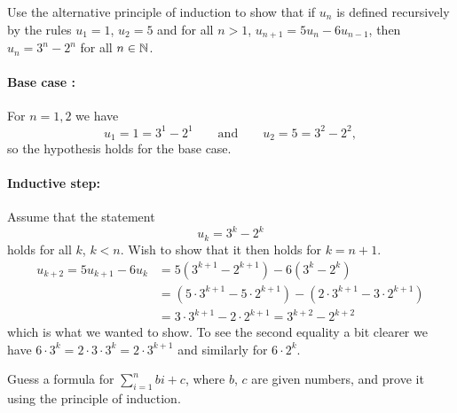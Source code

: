 \documentclass[a4paper, english, 12pt]{article} %
\begin{document}
\titlebox

\begin{problem}[5]
  Use the alternative principle of induction to show that if $u_n$ is defined
  recursively by the rules $u_1=1$, $u_2=5$ and for all $n > 1$, $u_{n+1} = 5 u_n -
  6 u_{n-1}$, then $u_n = 3^n - 2^n$ for all $n \in \mathbb{N}$.
\end{problem}

\begin{answer}
  \paragraph{Base case :} For $n=1,2$ we have
  \begin{equation*}
    u_1 = 1 = 3^1 - 2^1 \qquad \text{and} \qquad u_2 = 5 = 3^2 - 2^2 ,
  \end{equation*}
  so the hypothesis holds for the base case.
  \paragraph{Inductive step:} Assume that the statement
  \begin{equation*}
    u_{k} = 3^k - 2^k
  \end{equation*}
  holds for all $k$, $k < n$. Wish to show that it then holds for $k = n +1$.
  \begin{align*}
    u_{k+2} = 5 u_{k+1} - 6 u_{k}
    & = 5 (3^{k+1} - 2^{k+1}) - 6(3^{k} - 2^k) \\
    & = (5 \cdot 3^{k+1} - 5 \cdot 2^{k+1}) - (2 \cdot 3^{k+1} - 3 \cdot 2^{k+1}) \\
    & = 3 \cdot 3^{k+1} - 2 \cdot 2^{k+1}
    = 3^{k+2} - 2^{k+2}
  \end{align*}
  which is what we wanted to show. To see the second equality a bit clearer we
  have $6 \cdot 3^k = 2 \cdot 3 \cdot 3^k = 2 \cdot 3^{k+1}$ and similarly for
  $6 \cdot 2^k$. 
\end{answer}

\newpageanswer

\begin{problem}
  \begin{subproblem}
    \label{subproblem:6a}
    Guess a formula for $\sum_{i=1}^n bi + c$, where $b$, $c$ are given numbers,
    and prove it using the principle of induction. 
  \end{subproblem}
\end{problem}
\end{document}

